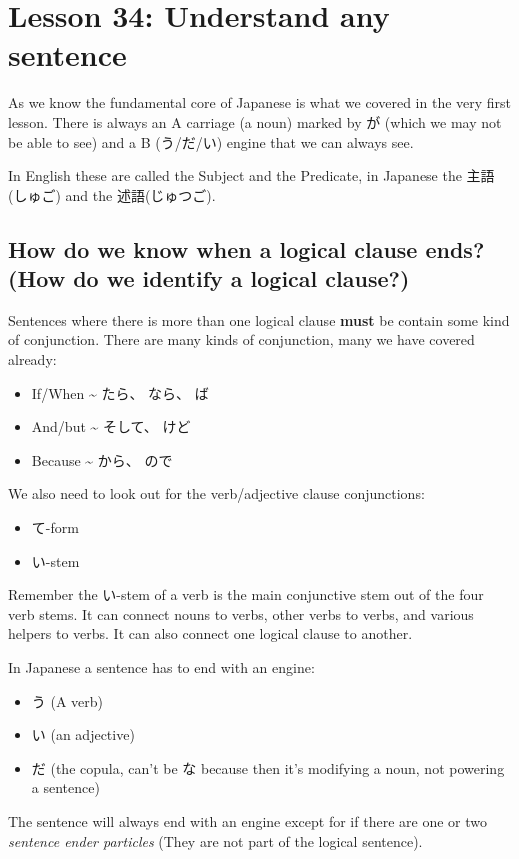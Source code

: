 \documentclass[11pt]{article}
\begin{document}
\section{Lesson 34: Understand any sentence}
\label{sec:org4376497}
As we know the fundamental core of Japanese is what we covered in the very first lesson. There is always an A carriage (a noun) marked by が (which we may not be able to see) and a B (う/だ/い) engine that we can always see.

In English these are called the Subject and the Predicate, in Japanese the 主語(しゅご) and the 述語(じゅつご).

\subsection{How do we know when a logical clause ends? (How do we identify a logical clause?)}
\label{sec:org7080047}
Sentences where there is more than one logical clause \textbf{must} be contain some kind of conjunction. There are many kinds of conjunction, many we have covered already:
\begin{itemize}
\item If/When \textasciitilde{} たら、 なら、 ば
\item And/but \textasciitilde{} そして、 けど
\item Because \textasciitilde{} から、 ので
\end{itemize}

We also need to look out for the verb/adjective clause conjunctions:
\begin{itemize}
\item て-form
\item い-stem
\end{itemize}

Remember the い-stem of a verb is the main conjunctive stem out of the four verb stems. It can connect nouns to verbs, other verbs to verbs, and various helpers to verbs. It can also connect one logical clause to another.

In Japanese a sentence has to end with an engine:
\begin{itemize}
\item う (A verb)
\item い (an adjective)
\item だ (the copula, can't be な because then it's modifying a noun, not powering a sentence)
\end{itemize}

The sentence will always end with an engine except for if there are one or two \emph{sentence ender particles} (They are not part of the logical sentence).
\end{document}
